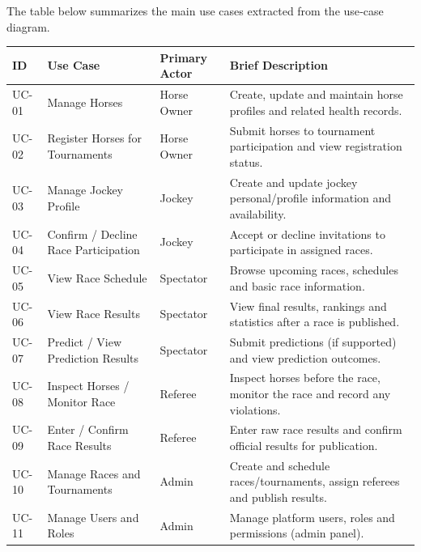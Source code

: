 The table below summarizes the main use cases extracted from the use‑case diagram.
\begin{center}
\begin{tabular}{|p{0.9cm}|p{4.5cm}|p{2.8cm}|p{6cm}|}
\hline
\textbf{ID} & \textbf{Use Case} & \textbf{Primary Actor} & \textbf{Brief Description} \\
\hline
UC-01 & Manage Horses & Horse Owner & Create, update and maintain horse profiles and related health records. \\
\hline
UC-02 & Register Horses for Tournaments & Horse Owner & Submit horses to tournament participation and view registration status. \\
\hline
UC-03 & Manage Jockey Profile & Jockey & Create and update jockey personal/profile information and availability. \\
\hline
UC-04 & Confirm / Decline Race Participation & Jockey & Accept or decline invitations to participate in assigned races. \\
\hline
UC-05 & View Race Schedule & Spectator & Browse upcoming races, schedules and basic race information. \\
\hline
UC-06 & View Race Results & Spectator & View final results, rankings and statistics after a race is published. \\
\hline
UC-07 & Predict / View Prediction Results & Spectator & Submit predictions (if supported) and view prediction outcomes. \\
\hline
UC-08 & Inspect Horses / Monitor Race & Referee & Inspect horses before the race, monitor the race and record any violations. \\
\hline
UC-09 & Enter / Confirm Race Results & Referee & Enter raw race results and confirm official results for publication. \\
\hline
UC-10 & Manage Races and Tournaments & Admin & Create and schedule races/tournaments, assign referees and publish results. \\
\hline
UC-11 & Manage Users and Roles & Admin & Manage platform users, roles and permissions (admin panel). \\
\hline
\end{tabular}
\end{center}
